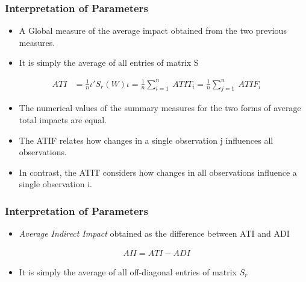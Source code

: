 \documentclass[
  shownotes,
  xcolor={svgnames},
  hyperref={colorlinks,citecolor=DarkBlue,linkcolor=DarkRed,urlcolor=DarkBlue}
  ]{beamer}
\begin{document}
\begin{frame}
\frametitle{Interpretation of Parameters}

\begin{itemize}
\item A Global measure of the average impact obtained from the two previous measures. 
\item It is simply the average of all entries of matrix S
\end{itemize}

\begin{align}
ATI &= \frac{1}{n}\iota'S_r(W) \iota = \frac{1}{n}\sum_{i=1}^n\ ATIT_i = \frac{1}{n}\sum_{j=1}^n\ ATIF_i
\end{align}

\begin{itemize}
  \item The numerical values of the summary measures for the two forms of average total impacts are equal.
  \item The ATIF relates how changes in a single observation j influences all observations.
  \item In contrast, the ATIT considers how changes in all observations influence a single observation i.
\end{itemize}


\end{frame}
\begin{frame}
\frametitle{Interpretation of Parameters}

\begin{itemize}
\item {\it Average Indirect Impact} obtained as the difference between ATI and ADI
\end{itemize}

\begin{align}
AII = ATI - ADI
\end{align}

\bigskip

\begin{itemize}
\item It is simply the average of all off-diagonal entries of matrix $S_r$
\end{itemize}


\end{frame}
\end{document}
